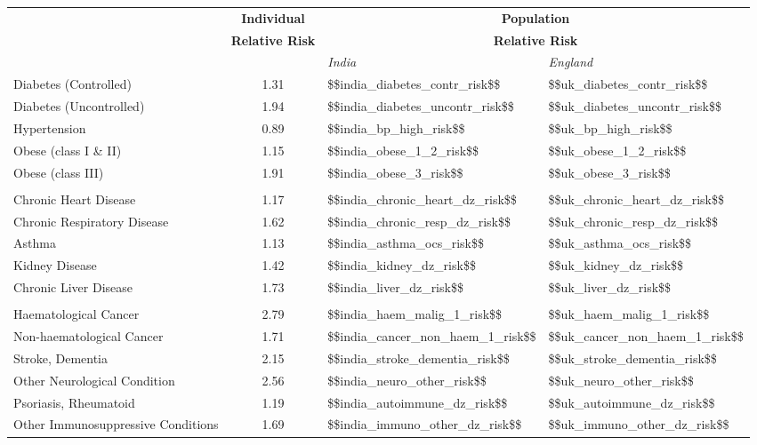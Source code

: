 \begin{tabular}{p{7cm}cp{1.25cm}p{1.5cm}}
& \textbf{{\footnotesize Individual}} &
  \multicolumn{2}{c}{{\textbf{\footnotesize{Population}}}} \\
& \textbf{{\footnotesize Relative Risk}} &
  \multicolumn{2}{c}{{\textbf{\footnotesize{Relative Risk}}}} \\[0.75ex]
  & & \emph{India} & \emph{England} \\[2ex]
Diabetes (Controlled) & \num{1.31} & \num{$$india_diabetes_contr_risk$$} & \num{$$uk_diabetes_contr_risk$$} \\[0.25ex]
Diabetes (Uncontrolled) & \num{1.94} & \num{$$india_diabetes_uncontr_risk$$} & \num{$$uk_diabetes_uncontr_risk$$} \\[0.25ex]
Hypertension & \num{0.89} & \num{$$india_bp_high_risk$$} & \num{$$uk_bp_high_risk$$} \\[0.25ex]
Obese (class I \& II) & \num{1.15} & \num{$$india_obese_1_2_risk$$} & \num{$$uk_obese_1_2_risk$$} \\[0.25ex]
Obese (class III) & \num{1.91} & \num{$$india_obese_3_risk$$} & \num{$$uk_obese_3_risk$$} \\[0.25ex]
\\
Chronic Heart Disease & \num{1.17} & \num{$$india_chronic_heart_dz_risk$$} & \num{$$uk_chronic_heart_dz_risk$$} \\[0.25ex]
Chronic Respiratory Disease & \num{1.62} & \num{$$india_chronic_resp_dz_risk$$} & \num{$$uk_chronic_resp_dz_risk$$} \\[0.25ex]
Asthma & \num{1.13} & \num{$$india_asthma_ocs_risk$$} & \num{$$uk_asthma_ocs_risk$$} \\[0.25ex]
Kidney Disease & \num{1.42} & \num{$$india_kidney_dz_risk$$} & \num{$$uk_kidney_dz_risk$$} \\[0.25ex]
Chronic Liver Disease & \num{1.73} & \num{$$india_liver_dz_risk$$} & \num{$$uk_liver_dz_risk$$} \\[0.25ex]
\\
Haematological Cancer & \num{2.79} & \num{$$india_haem_malig_1_risk$$} & \num{$$uk_haem_malig_1_risk$$} \\[0.25ex]
Non-haematological Cancer & \num{1.71} & \num{$$india_cancer_non_haem_1_risk$$} & \num{$$uk_cancer_non_haem_1_risk$$} \\[0.25ex]
Stroke, Dementia & \num{2.15} & \num{$$india_stroke_dementia_risk$$} & \num{$$uk_stroke_dementia_risk$$} \\[0.25ex]
Other Neurological Condition & \num{2.56} & \num{$$india_neuro_other_risk$$} & \num{$$uk_neuro_other_risk$$} \\[0.25ex]
Psoriasis, Rheumatoid & \num{1.19} & \num{$$india_autoimmune_dz_risk$$} & \num{$$uk_autoimmune_dz_risk$$} \\[0.25ex]
Other Immunosuppressive Conditions & \num{1.69} & \num{$$india_immuno_other_dz_risk$$} & \num{$$uk_immuno_other_dz_risk$$} \\[0.25ex]
\end{tabular}


